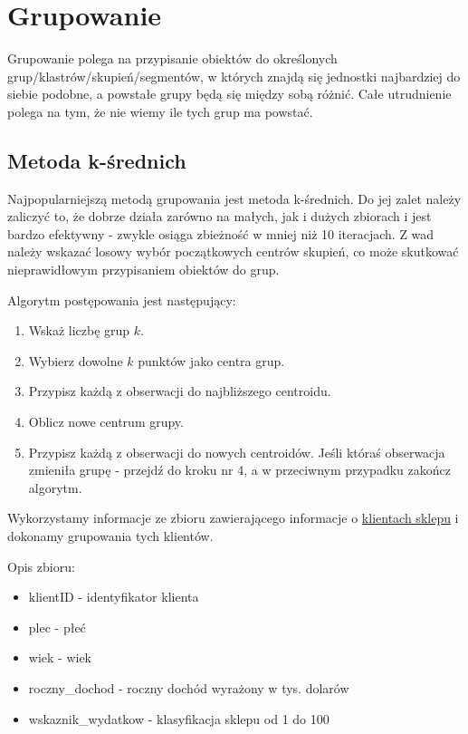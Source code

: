 \documentclass[]{book}
\providecommand{\tightlist}{%
  \setlength{\itemsep}{0pt}\setlength{\parskip}{0pt}}
\begin{document}
\hypertarget{grupowanie}{%
\chapter{Grupowanie}\label{grupowanie}}

Grupowanie polega na przypisanie obiektów do określonych grup/klastrów/skupień/segmentów, w których znajdą się jednostki najbardziej do siebie podobne, a powstałe grupy będą się między sobą różnić. Całe utrudnienie polega na tym, że nie wiemy ile tych grup ma powstać.

\hypertarget{metoda-k-srednich}{%
\section{Metoda k-średnich}\label{metoda-k-srednich}}

Najpopularniejszą metodą grupowania jest metoda k-średnich. Do jej zalet należy zaliczyć to, że dobrze działa zarówno na małych, jak i dużych zbiorach i jest bardzo efektywny - zwykle osiąga zbieżność w mniej niż 10 iteracjach. Z wad należy wskazać losowy wybór początkowych centrów skupień, co może skutkować nieprawidłowym przypisaniem obiektów do grup.

Algorytm postępowania jest następujący:

\begin{enumerate}
\def\labelenumi{\arabic{enumi}.}
\tightlist
\item
  Wskaż liczbę grup \(k\).
\item
  Wybierz dowolne \(k\) punktów jako centra grup.
\item
  Przypisz każdą z obserwacji do najbliższego centroidu.
\item
  Oblicz nowe centrum grupy.
\item
  Przypisz każdą z obserwacji do nowych centroidów. Jeśli któraś obserwacja zmieniła grupę - przejdź do kroku nr 4, a w przeciwnym przypadku zakończ algorytm.
\end{enumerate}

Wykorzystamy informacje ze zbioru zawierającego informacje o \href{data/klienci.csv}{klientach sklepu} i dokonamy grupowania tych klientów.

Opis zbioru:

\begin{itemize}
\tightlist
\item
  klientID - identyfikator klienta
\item
  plec - płeć
\item
  wiek - wiek
\item
  roczny\_dochod - roczny dochód wyrażony w tys. dolarów
\item
  wskaznik\_wydatkow - klasyfikacja sklepu od 1 do 100
\end{itemize}
\end{document}
